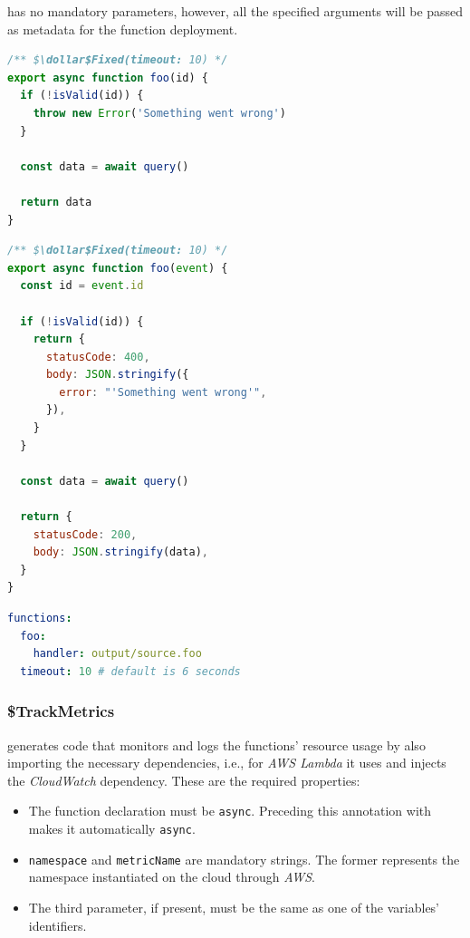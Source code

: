  has no mandatory parameters, however, all the specified arguments will be
passed as metadata for the function deployment.

\begin{lstlisting}[language=javascript, caption={Input code for \annotation{$\dollar$Fixed}}]
/** $\dollar$Fixed(timeout: 10) */
export async function foo(id) {
  if (!isValid(id)) {
    throw new Error('Something went wrong')
  }

  const data = await query()

  return data
}
\end{lstlisting}


\begin{lstlisting}[language=javascript, caption={Output code from \annotation{$\dollar$Fixed}}]
/** $\dollar$Fixed(timeout: 10) */
export async function foo(event) {
  const id = event.id

  if (!isValid(id)) {
    return {
      statusCode: 400,
      body: JSON.stringify({
        error: "'Something went wrong'",
      }),
    }
  }

  const data = await query()

  return {
    statusCode: 200,
    body: JSON.stringify(data),
  }
}
\end{lstlisting}

\begin{lstlisting}[language=yaml, caption={Generated Metadata through \annotation{$\dollar$Fixed}}]
functions:
  foo:
    handler: output/source.foo
  timeout: 10 # default is 6 seconds
\end{lstlisting}

\subsubsection{\$TrackMetrics}
generates code that monitors and logs the functions’ resource usage
by also importing the necessary dependencies, i.e., for \textit{AWS Lambda}
it uses and injects the \textit{CloudWatch} dependency.
These are the required properties:
\begin{itemize}
  \item The function declaration must be \verb|async|.
    Preceding this annotation with  makes it automatically \verb|async|.
  \item \verb|namespace| and \verb|metricName| are mandatory strings.
    The former represents the namespace instantiated on the cloud through \textit{AWS}.
  \item The third parameter, if present, must be the same as one of the variables' identifiers.
\end{itemize}

